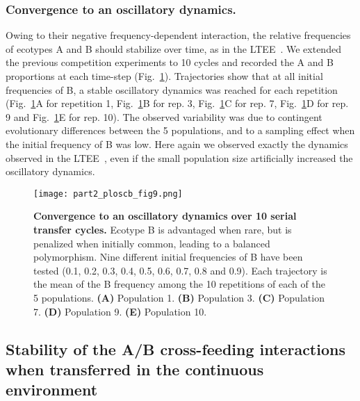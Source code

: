 
\subsubsection*{Convergence to an oscillatory dynamics.}

Owing to their negative frequency-dependent interaction, the relative frequencies of ecotypes A and B should stabilize over time, as in the LTEE~\citep{rozen-et-al-2000}.
We extended the previous competition experiments to 10 cycles and recorded the A and B proportions at each time-step (Fig.~\ref{fig:part2:first_result:Fig9}). Trajectories show that at all initial frequencies of B, a stable oscillatory dynamics was reached for each repetition (Fig.~\ref{fig:part2:first_result:Fig9}A for repetition 1, Fig.~\ref{fig:part2:first_result:Fig9}B for rep. 3, Fig.~\ref{fig:part2:first_result:Fig9}C for rep. 7, Fig.~\ref{fig:part2:first_result:Fig9}D for rep. 9 and Fig.~\ref{fig:part2:first_result:Fig9}E for rep. 10). The observed variability was due to contingent evolutionary differences between the 5 populations, and to a sampling effect when the initial frequency of B was low. Here again we observed exactly the dynamics observed in the LTEE~\citep{rozen-et-al-2000,ribeck-lenski-2015}, even if the small population size artificially increased the oscillatory dynamics.

\begin{figure}[!h]
\centering
\texttt{[image: part2\_ploscb\_fig9.png]}
\caption[Convergence to an oscillatory dynamics over 10 serial transfer cycles.]{{\bf Convergence to an oscillatory dynamics over 10 serial transfer cycles.} Ecotype B is advantaged when rare, but is penalized when initially common, leading to a balanced polymorphism. Nine different initial frequencies of B have been tested (0.1, 0.2, 0.3, 0.4, 0.5, 0.6, 0.7, 0.8 and 0.9). Each trajectory is the mean of the B frequency among the 10 repetitions of each of the 5 populations. {\bf (A)} Population 1. {\bf (B)} Population 3. {\bf (C)} Population 7. {\bf (D)} Population 9. {\bf (E)} Population 10.}
\label{fig:part2:first_result:Fig9}
\end{figure}


\subsection*{Stability of the A/B cross-feeding interactions when transferred in the continuous environment}

